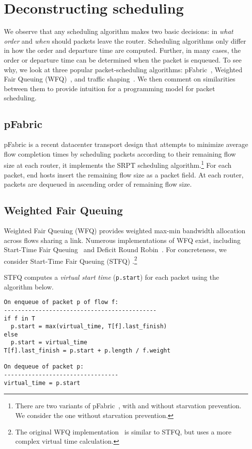 \section{Deconstructing scheduling}
\label{s:deconstruct}

We observe that any scheduling algorithm makes two basic decisions: in  {\em
what order} and {\em when} should packets leave the router.  Scheduling
algorithms only differ in how the order and departure time are computed.
Further, in many cases, the order or departure time can be determined when the
packet is enqueued.  To see why, we look at three popular packet-scheduling
algorithms: pFabric~\cite{pFabric}, Weighted Fair Queuing (WFQ)~\cite{wfq}, and
traffic shaping~\cite{tbf}. We then comment on similarities between them to
provide intuition for a programming model for packet scheduling.

\subsection{pFabric}
pFabric is a recent datacenter transport design that attempts
to minimize average flow completion times by scheduling packets according to
their remaining flow size at each router, \ie it implements the SRPT scheduling
algorithm.\footnote{There are two variants of pFabric~\cite{pFabric}, with and
without starvation prevention.  We consider the one without starvation
prevention.} For each packet, end hosts insert the remaining flow size as a
packet field. At each router, packets are dequeued in ascending order of
remaining flow size.

\subsection{Weighted Fair Queuing}
Weighted Fair Queuing (WFQ) provides weighted
max-min bandwidth allocation across flows sharing a link. Numerous
implementations of WFQ exist, including Start-Time Fair Queuing~\cite{stfq} and
Deficit Round Robin~\cite{drr}. For concreteness, we consider Start-Time Fair
Queuing (STFQ) .\footnote{The original WFQ implementation~\cite{wfq} is similar
to STFQ, but uses a more complex virtual time calculation.}

STFQ computes a {\em virtual start time} ({\tt p.start}) for each packet using
the algorithm below. 
\begin{lstlisting}[style=customc]
On enqueue of packet p of flow f:
--------------------------------------------
if f in T
  p.start = max(virtual_time, T[f].last_finish)
else
  p.start = virtual_time
T[f].last_finish = p.start + p.length / f.weight

On dequeue of packet p:
---------------------------------
virtual_time = p.start
\end{lstlisting}

